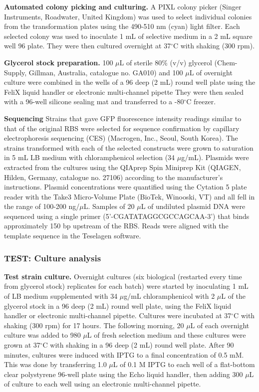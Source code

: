 \documentclass{scrartcl}[2013/05/29]%
\begin{document}
\textbf{Automated colony picking and culturing.}
A PIXL colony picker (Singer Instruments, Roadwater, United Kingdom) was used to select individual colonies from the transformation plates using the 490-510 nm (cyan) light filter.
Each selected colony was used to inoculate 1 mL of selective medium in a 2 mL square well 96 plate.
They were then cultured overnight at 37$^{\circ}$C with shaking (300 rpm).

\textbf{Glycerol stock preparation.}
100 $\mu$L of sterile 80\% (v/v) glycerol (Chem-Supply, Gillman, Australia, catalogue no. GA010) and 100 $\mu$L of overnight culture were combined in the wells of a 96 deep (2 mL) round well plate using the FeliX liquid handler or electronic multi-channel pipette
They were then sealed with a 96-well silicone sealing mat and transferred to a -80$^{\circ}$C freezer. 

\textbf{Sequencing}
Strains that gave GFP fluorescence intensity readings similar to that of the original RBS were selected for sequence confirmation by capillary electrophoresis sequencing (CES) (Macrogen, Inc., Seoul, South Korea).
The strains transformed with each of the selected constructs were grown to saturation in 5 mL LB medium with chloramphenicol selection (34 $\mu$g/mL).
Plasmids were extracted from the cultures using the QIAprep Spin Miniprep Kit (QIAGEN, Hilden, Germany, catalogue no. 27106) according to the manufacturer's instructions.
Plasmid concentrations were quantified using the Cytation 5 plate reader with the Take3 Micro-Volume Plate (BioTek, Winooski, VT) and all fell in the range of 100-200 ng/$\mu$L.
Samples of 20 $\mu$L of undiluted plasmid DNA were sequenced using a single primer (5'-CGATATAGGCGCCAGCAA-3') that binds approximately 150 bp upstream of the RBS.
Reads were aligned with the template sequence in the Teselagen software.

\subsubsection{TEST: Culture analysis}

\textbf{Test strain culture.}
Overnight cultures (six biological (restarted every time from glycerol stock) replicates for each batch) were started by inoculating 1 mL of LB medium supplemented with 34 $\mu$g/mL chloramphenicol with 2 $\mu$L of the glycerol stock in a 96 deep (2 mL) round well plate, using the FeliX liquid handler or electronic multi-channel pipette.
Cultures were incubated at 37$^{\circ}$C with shaking (300 rpm) for 17 hours. 
The following morning, 20 $\mu$L of each overnight culture was added to 980 $\mu$L of fresh selection medium and these cultures were grown at 37$^{\circ}$C with shaking in a 96 deep (2 mL) round well plate. 
After 90 minutes, cultures were induced with IPTG to a final concentration of 0.5 mM. This was done by transferring 1.0 $\mu$L of 0.1 M IPTG to each well of a flat-bottom clear polystyrene 96-well plate using the Echo liquid handler, then adding 300 $\mu$L of culture to each well using an electronic multi-channel pipette.
\end{document}
